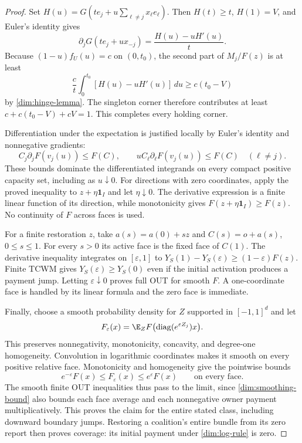 \begin{proof}
Set $H(u)=G(te_j+u\sum_{\ell\ne j}x_\ell e_\ell)$.
Then $H(t)\ge t$, $H(1)=V$, and Euler's identity gives
\[
 \partial_jG(te_j+u x_{-j})
 =\frac{H(u)-uH'(u)}{t}.
\]
Because $(1-u)f_U(u)=c$ on $(0,t_0)$, the second part of $M_j/F(z)$
is at least
\[
 \frac{c}{t}\int_0^{t_0}[H(u)-uH'(u)]\,du
 \ge c(t_0-V)
\]
by \eqref{dim:hinge-lemma}. The singleton corner therefore contributes at
least $c+c(t_0-V)+cV=1$. This completes every holding corner.

Differentiation under the expectation is justified locally by Euler's
identity and nonnegative gradients:
\[
 C_j\partial_jF(v_j(u))\le F(C),\qquad
 uC_\ell\partial_\ell F(v_j(u))\le F(C)\quad(\ell\ne j).
\]
These bounds dominate the differentiated integrands on every compact
positive capacity set, including as $u\downarrow0$.
For directions with zero coordinates, apply the proved inequality to
$z+\eta\mathbf1_I$ and let $\eta\downarrow0$. The derivative expression
is a finite linear function of its direction, while monotonicity gives
$F(z+\eta\mathbf1_I)\ge F(z)$. No continuity of $F$ across faces is used.

For a finite restoration $z$, take $a(s)=a(0)+sz$ and
$C(s)=o+a(s)$, $0\le s\le1$. For every $s>0$ its active face is the
fixed face of $C(1)$. The derivative inequality integrates on
$[\varepsilon,1]$ to
$Y_S(1)-Y_S(\varepsilon)\ge(1-\varepsilon)F(z)$.
Finite TCWM gives $Y_S(\varepsilon)\ge Y_S(0)$ even if the initial
activation produces a payment jump. Letting $\varepsilon\downarrow0$
proves full OUT for smooth $F$. A one-coordinate face is handled by its
linear formula and the zero face is immediate.

Finally, choose a smooth probability density for $Z$ supported in
$[-1,1]^d$ and let
\[
 F_\varepsilon(x)=\E_Z
 F\bigl(\operatorname{diag}(e^{\varepsilon Z_j})x\bigr).
\]
This preserves nonnegativity, monotonicity, concavity, and degree-one
homogeneity. Convolution in logarithmic coordinates makes it smooth on
every positive relative face. Monotonicity and homogeneity give the
pointwise bounds
\begin{equation}\label{dim:smoothing-bound}
 e^{-\varepsilon}F(x)\le F_\varepsilon(x)
 \le e^\varepsilon F(x)
 \qquad\text{on every face.}
\end{equation}
The smooth finite OUT inequalities thus pass to the limit, since
\eqref{dim:smoothing-bound} also bounds each face average and each
nonnegative owner payment multiplicatively. This proves the claim for the
entire stated class, including downward boundary jumps.
Restoring a coalition's entire bundle from its zero report then proves
coverage: its initial payment under \eqref{dim:log-rule} is zero.
\end{proof}

